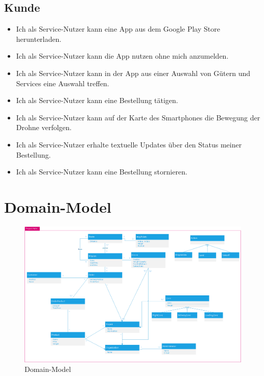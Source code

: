 \subsection{Kunde}
\begin{itemize}
\item Ich als Service-Nutzer kann eine App aus dem Google Play Store herunterladen.
\item Ich als Service-Nutzer kann die App nutzen ohne mich anzumelden.
\item Ich als Service-Nutzer kann in der App aus einer Auswahl von Gütern und Services eine Auswahl treffen.
\item Ich als Service-Nutzer kann eine Bestellung tätigen.
\item Ich als Service-Nutzer kann auf der Karte des Smartphones die Bewegung der Drohne verfolgen.
\item Ich als Service-Nutzer erhalte textuelle Updates über den Status meiner Bestellung.
\item Ich als Service-Nutzer kann eine Bestellung stornieren.
\end{itemize}

\section{Domain-Model}

\begin{figure}
	\includegraphics[width=1.0\textwidth]{images/domainmodell.png} 
	\caption{Domain-Model} 
	\label{fig:domain-model}
\end{figure}

